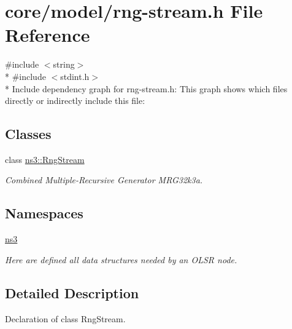 \hypertarget{rng-stream_8h}{}\section{core/model/rng-\/stream.h File Reference}
\label{rng-stream_8h}
{\ttfamily \#include $<$string$>$}\\*
{\ttfamily \#include $<$stdint.\+h$>$}\\*
Include dependency graph for rng-\/stream.h\+:
This graph shows which files directly or indirectly include this file\+:
\subsection*{Classes}
\begin{DoxyCompactItemize}
\item 
class \hyperlink{classns3_1_1RngStream}{ns3\+::\+Rng\+Stream}
\begin{DoxyCompactList}\small\item\em Combined Multiple-\/\+Recursive Generator M\+R\+G32k3a. \end{DoxyCompactList}\end{DoxyCompactItemize}
\subsection*{Namespaces}
\begin{DoxyCompactItemize}
\item 
 \hyperlink{namespacens3}{ns3}
\begin{DoxyCompactList}\small\item\em Here are defined all data structures needed by an O\+L\+SR node. \end{DoxyCompactList}\end{DoxyCompactItemize}


\subsection{Detailed Description}
Declaration of class Rng\+Stream. 